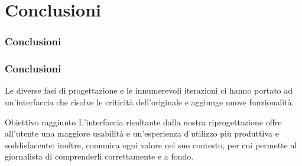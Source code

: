 \documentclass[../../main.tex]{subfiles}
\begin{document}
\section{Conclusioni}

\begin{frame}
    \frametitle{Conclusioni}
\end{frame}

\begin{frame}
    \frametitle{Conclusioni}
    Le diverse fasi di progettazione e le innumerevoli iterazioni ci hanno portato ad un'interfaccia che risolve le criticità dell'originale e aggiunge nuove funzionalità.
    \vspace{-20pt}
    \begin{alertblock}{Obiettivo raggiunto}
        L'interfaccia risultante dalla nostra riprogettazione offre all'utente una maggiore usabilità e un'esperienza d'utilizzo più produttiva e soddisfacente: inoltre, comunica ogni valore nel suo contesto, per cui permette al giornalista di comprenderli correttamente e a fondo.
    \end{alertblock}
\end{frame}
\end{document}

